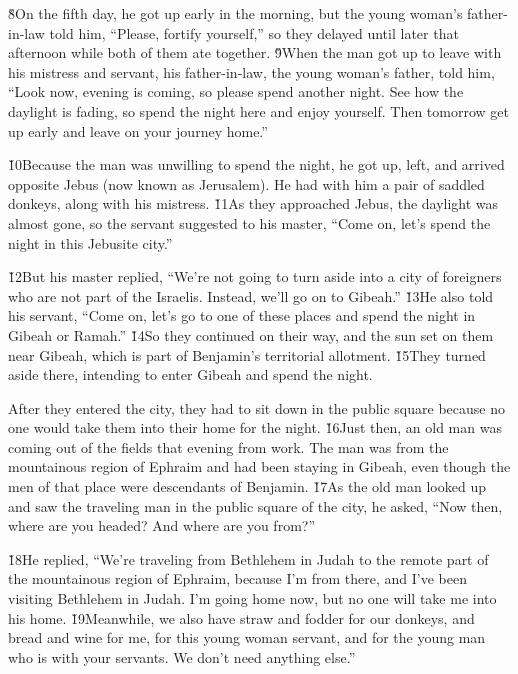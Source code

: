 \v{8}On the fifth day, he got up early in the morning, but the young woman's father-in-law told him, ``Please, fortify yourself,'' so they delayed until later that afternoon while both of them ate together. \v{9}When the man got up to leave with his mistress and servant, his father-in-law, the young woman's father, told him, ``Look now, evening is coming, so please spend another night. See how the daylight is fading, so spend the night here and enjoy yourself. Then tomorrow get up early and leave on your journey home.''

\v{10}Because the man was unwilling to spend the night, he got up, left, and arrived opposite Jebus (now known as Jerusalem). He had with him a pair of saddled donkeys, along with his mistress. \v{11}As they approached Jebus, the daylight was almost gone, so the servant suggested to his master, ``Come on, let's spend the night in this Jebusite city.''

\v{12}But his master replied, ``We're not going to turn aside into a city of foreigners who are not part of the Israelis. Instead, we'll go on to Gibeah.'' \v{13}He also told his servant, ``Come on, let's go to one of these places and spend the night in Gibeah or Ramah.'' \v{14}So they continued on their way, and the sun set on them near Gibeah, which is part of Benjamin's territorial allotment. \v{15}They turned aside there, intending to enter Gibeah and spend the night.

After they entered the city, they had to sit down in the public square because no one would take them into their home for the night. \v{16}Just then, an old man was coming out of the fields that evening from work. The man was from the mountainous region of Ephraim and had been staying in Gibeah, even though the men of that place were descendants of Benjamin. \v{17}As the old man looked up and saw the traveling man in the public square of the city, he asked, ``Now then, where are you headed? And where are you from?''

\v{18}He replied, ``We're traveling from Bethlehem in Judah to the remote part of the mountainous region of Ephraim, because I'm from there, and I've been visiting Bethlehem in Judah. I'm going home now, but no one will take me into his home. \v{19}Meanwhile, we also have straw and fodder for our donkeys, and bread and wine for me, for this young woman servant, and for the young man who is with your servants. We don't need anything else.''

